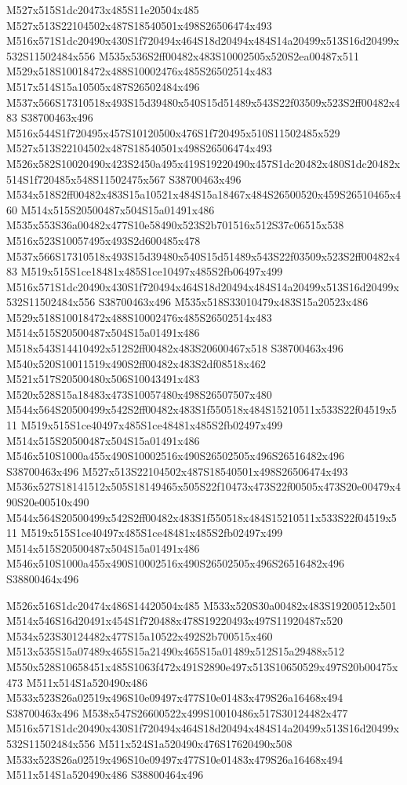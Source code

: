 \documentclass{article}
\begin{document}
\begin{multicols}{2}
M527x515S1dc20473x485S11e20504x485 M527x513S22104502x487S18540501x498S26506474x493 M516x571S1dc20490x430S1f720494x464S18d20494x484S14a20499x513S16d20499x532S11502484x556 M535x536S2ff00482x483S10002505x520S2ea00487x511 M529x518S10018472x488S10002476x485S26502514x483 M517x514S15a10505x487S26502484x496 M537x566S17310518x493S15d39480x540S15d51489x543S22f03509x523S2ff00482x483 S38700463x496 M516x544S1f720495x457S10120500x476S1f720495x510S11502485x529 M527x513S22104502x487S18540501x498S26506474x493 M526x582S10020490x423S2450a495x419S19220490x457S1dc20482x480S1dc20482x514S1f720485x548S11502475x567 S38700463x496 M534x518S2ff00482x483S15a10521x484S15a18467x484S26500520x459S26510465x460 M514x515S20500487x504S15a01491x486 M535x553S36a00482x477S10e58490x523S2b701516x512S37c06515x538 M516x523S10057495x493S2d600485x478 M537x566S17310518x493S15d39480x540S15d51489x543S22f03509x523S2ff00482x483 M519x515S1ce18481x485S1ce10497x485S2fb06497x499 M516x571S1dc20490x430S1f720494x464S18d20494x484S14a20499x513S16d20499x532S11502484x556 S38700463x496 M535x518S33010479x483S15a20523x486 M529x518S10018472x488S10002476x485S26502514x483 M514x515S20500487x504S15a01491x486 M518x543S14410492x512S2ff00482x483S20600467x518 S38700463x496 M540x520S10011519x490S2ff00482x483S2df08518x462 M521x517S20500480x506S10043491x483 M520x528S15a18483x473S10057480x498S26507507x480 M544x564S20500499x542S2ff00482x483S1f550518x484S15210511x533S22f04519x511 M519x515S1ce40497x485S1ce48481x485S2fb02497x499 M514x515S20500487x504S15a01491x486 M546x510S1000a455x490S10002516x490S26502505x496S26516482x496 S38700463x496 M527x513S22104502x487S18540501x498S26506474x493 M536x527S18141512x505S18149465x505S22f10473x473S22f00505x473S20e00479x490S20e00510x490 M544x564S20500499x542S2ff00482x483S1f550518x484S15210511x533S22f04519x511 M519x515S1ce40497x485S1ce48481x485S2fb02497x499 M514x515S20500487x504S15a01491x486 M546x510S1000a455x490S10002516x490S26502505x496S26516482x496 S38800464x496

M526x516S1dc20474x486S14420504x485 M533x520S30a00482x483S19200512x501 M514x546S16d20491x454S1f720488x478S19220493x497S11920487x520 M534x523S30124482x477S15a10522x492S2b700515x460 M513x535S15a07489x465S15a21490x465S15a01489x512S15a29488x512 M550x528S10658451x485S1063f472x491S2890e497x513S10650529x497S20b00475x473 M511x514S1a520490x486 M533x523S26a02519x496S10e09497x477S10e01483x479S26a16468x494 S38700463x496 M538x547S26600522x499S10010486x517S30124482x477 M516x571S1dc20490x430S1f720494x464S18d20494x484S14a20499x513S16d20499x532S11502484x556 M511x524S1a520490x476S17620490x508 M533x523S26a02519x496S10e09497x477S10e01483x479S26a16468x494 M511x514S1a520490x486 S38800464x496


\end{multicols}
\end{document}
